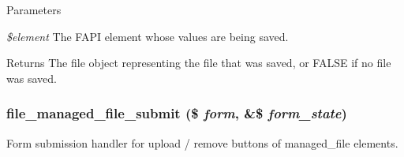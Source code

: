 \begin{DoxyParams}{Parameters}
\item[{\em \$element}]The FAPI element whose values are being saved.\end{DoxyParams}
\begin{DoxyReturn}{Returns}
The file object representing the file that was saved, or FALSE if no file was saved. 
\end{DoxyReturn}
\hypertarget{file_8module_a4343cdafac927e9f8ba7156776829c71}{
\subsubsection[{file\_\-managed\_\-file\_\-submit}]{\setlength{\rightskip}{0pt plus 5cm}file\_\-managed\_\-file\_\-submit (\$ {\em form}, \/  \&\$ {\em form\_\-state})}}
\label{file_8module_a4343cdafac927e9f8ba7156776829c71}
Form submission handler for upload / remove buttons of managed\_\-file elements.

